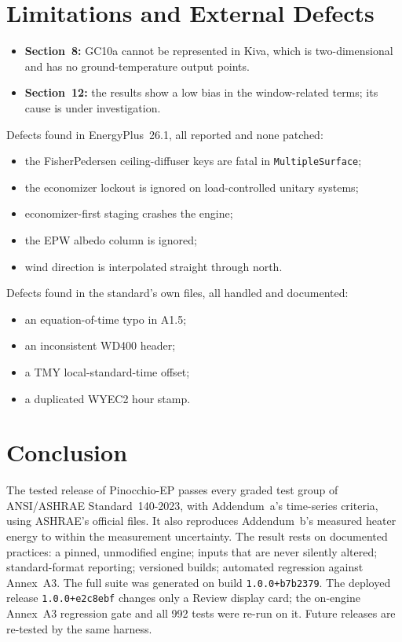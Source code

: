 \documentclass[conference,10pt]{IEEEtran}
\newcommand{\code}[1]{\texttt{\footnotesize #1}}
\begin{document}
\section{Limitations and External Defects}\label{sec:limits}
\begin{itemize}
\item \textbf{Section~8:} GC10a cannot be represented in Kiva, which is two-dimensional and has no ground-temperature
output points.
\item \textbf{Section~12:} the results show a low bias in the window-related terms; its cause is under
investigation.
\end{itemize}
Defects found in EnergyPlus~26.1, all reported and none patched:
\begin{itemize}
\item the FisherPedersen ceiling-diffuser keys are fatal in \code{MultipleSurface};
\item the economizer lockout is ignored on load-controlled unitary systems;
\item economizer-first staging crashes the engine;
\item the EPW albedo column is ignored;
\item wind direction is interpolated straight through north.
\end{itemize}
Defects found in the standard's own files, all handled and documented:
\begin{itemize}
\item an equation-of-time typo in A1.5;
\item an inconsistent WD400 header;
\item a TMY local-standard-time offset;
\item a duplicated WYEC2 hour stamp.
\end{itemize}

\section{Conclusion}
The tested release of Pinocchio-EP passes every graded test group of ANSI/ASHRAE Standard~140-2023, with
Addendum~a's time-series criteria, using ASHRAE's official files. It also reproduces Addendum~b's measured heater
energy to within the measurement uncertainty. The result rests on documented practices: a pinned, unmodified
engine; inputs that are never silently altered; standard-format reporting; versioned builds; automated regression
against Annex~A3. The full suite was generated on build \code{1.0.0+b7b2379}. The deployed release
\code{1.0.0+e2c8ebf} changes only a Review display card; the on-engine Annex~A3 regression gate and all 992 tests
were re-run on it. Future releases are re-tested by the same harness.
\end{document}
